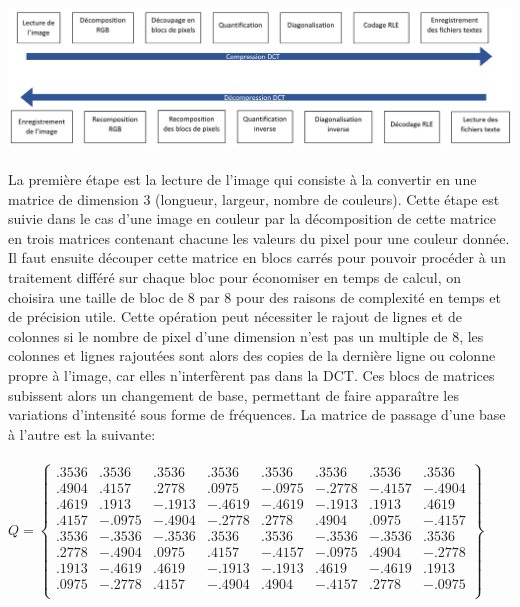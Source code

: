 \documentclass[12pt]{article}
\begin{document}
\paragraph{}
\includegraphics[scale=0.2]{schema_dct.png} %
\paragraph{}
La première étape est la lecture de l’image qui consiste à la convertir en une matrice de dimension 3 (longueur, largeur, nombre de couleurs). Cette étape est suivie dans le cas d’une image en couleur par la décomposition de cette matrice en trois matrices contenant chacune les valeurs du pixel pour une couleur donnée. Il faut ensuite découper cette matrice en blocs carrés pour pouvoir procéder à un traitement différé sur chaque bloc pour économiser en temps de calcul, on choisira une taille de bloc de 8 par 8 pour des raisons de complexité en temps et de précision utile. Cette opération peut nécessiter le rajout de lignes et de colonnes si le nombre de pixel d’une dimension n’est pas un multiple de 8, les colonnes et lignes rajoutées sont alors des copies de la dernière ligne ou colonne propre à l’image, car elles n’interfèrent pas dans la DCT. Ces blocs de matrices subissent alors un changement de base, permettant de faire apparaître les variations d’intensité sous forme de fréquences. La matrice de passage d’une base à l’autre est la suivante:
\paragraph{}
\begin{center}
$Q=
\begin{Bmatrix}

.3536& .3536& .3536& .3536& .3536& .3536& .3536& .3536 \\
.4904& .4157& .2778& .0975& -.0975& -.2778& -.4157& -.4904 \\
.4619& .1913& -.1913& -.4619& -.4619& -.1913& .1913& .4619 \\
.4157& -.0975& -.4904& -.2778 & .2778& .4904& .0975& -.4157 \\
.3536& -.3536& -.3536& .3536& .3536& -.3536& -.3536& .3536 \\
.2778& -.4904& .0975& .4157& -.4157& -.0975& .4904& -.2778 \\
.1913& -.4619& .4619& -.1913& -.1913& .4619& -.4619& .1913 \\
.0975& -.2778& .4157& -.4904& .4904& -.4157& .2778& -.0975 \\

\end{Bmatrix}
$
\end{center}
\end{document}
